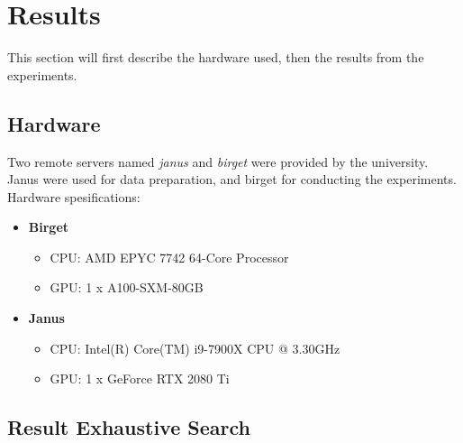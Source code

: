 \chapter{Results} \label{results}
This section will first describe the hardware used, then the results from the experiments.

\section{Hardware}
    Two remote servers named \textit{janus} and \textit{birget} were provided by the university. Janus were used for data preparation, and birget for conducting the experiments. Hardware spesifications: 
\begin{itemize}
  \item \textbf{Birget}
  \begin{itemize}
    \item CPU: AMD EPYC 7742 64-Core Processor
    \item GPU: 1 x A100-SXM-80GB
  \end{itemize}
  \item \textbf{Janus}
  \begin{itemize}
    \item CPU: Intel(R) Core(TM) i9-7900X CPU @ 3.30GHz
    \item GPU: 1 x GeForce RTX 2080 Ti
  \end{itemize}
\end{itemize}





\section{Result Exhaustive Search}
    
